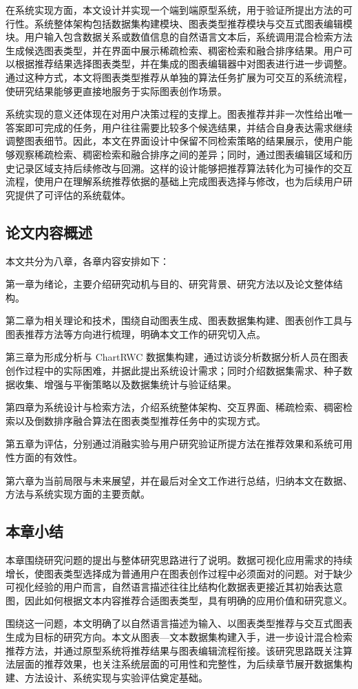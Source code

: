 在系统实现方面，本文设计并实现一个端到端原型系统，用于验证所提出方法的可行性。系统整体架构包括数据集构建模块、图表类型推荐模块与交互式图表编辑模块。用户输入包含数据关系或数值信息的自然语言文本后，系统调用混合检索方法生成候选图表类型，并在界面中展示稀疏检索、稠密检索和融合排序结果。用户可以根据推荐结果选择图表类型，并在集成的图表编辑器中对图表进行进一步调整。通过这种方式，本文将图表类型推荐从单独的算法任务扩展为可交互的系统流程，使研究结果能够更直接地服务于实际图表创作场景。

系统实现的意义还体现在对用户决策过程的支撑上。图表推荐并非一次性给出唯一答案即可完成的任务，用户往往需要比较多个候选结果，并结合自身表达需求继续调整图表细节。因此，本文在界面设计中保留不同检索策略的结果展示，使用户能够观察稀疏检索、稠密检索和融合排序之间的差异；同时，通过图表编辑区域和历史记录区域支持后续修改与回溯。这样的设计能够把推荐算法转化为可操作的交互流程，使用户在理解系统推荐依据的基础上完成图表选择与修改，也为后续用户研究提供了可评估的系统载体。



\subsection{论文内容概述}

本文共分为八章，各章内容安排如下：

第一章为绪论，主要介绍研究动机与目的、研究背景、研究方法以及论文整体结构。

第二章为相关理论和技术，围绕自动图表生成、图表数据集构建、图表创作工具与图表推荐方法等方向进行梳理，明确本文工作的研究切入点。

第三章为形成分析与 ChartRWC 数据集构建，通过访谈分析数据分析人员在图表创作过程中的实际困难，并据此提出系统设计需求；同时介绍数据集需求、种子数据收集、增强与平衡策略以及数据集统计与验证结果。

第四章为系统设计与检索方法，介绍系统整体架构、交互界面、稀疏检索、稠密检索以及倒数排序融合算法在图表类型推荐任务中的实现方式。

第五章为评估，分别通过消融实验与用户研究验证所提方法在推荐效果和系统可用性方面的有效性。

第六章为当前局限与未来展望，并在最后对全文工作进行总结，归纳本文在数据、方法与系统实现方面的主要贡献。

\subsection{本章小结}
本章围绕研究问题的提出与整体研究思路进行了说明。数据可视化应用需求的持续增长，使图表类型选择成为普通用户在图表创作过程中必须面对的问题。对于缺少可视化经验的用户而言，自然语言描述往往比结构化数据表更接近其初始表达意图，因此如何根据文本内容推荐合适图表类型，具有明确的应用价值和研究意义。

围绕这一问题，本文明确了以自然语言描述为输入、以图表类型推荐与交互式图表生成为目标的研究方向。本文从图表—文本数据集构建入手，进一步设计混合检索推荐方法，并通过原型系统将推荐结果与图表编辑流程衔接。该研究思路既关注算法层面的推荐效果，也关注系统层面的可用性和完整性，为后续章节展开数据集构建、方法设计、系统实现与实验评估奠定基础。


\newpage


